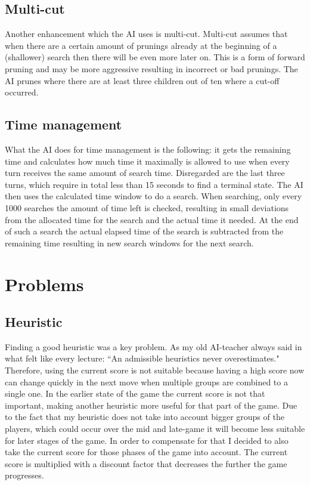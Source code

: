 \documentclass[a4paper]{article}
\begin{document}
\subsection{Multi-cut}
Another enhancement which the AI uses is multi-cut. Multi-cut assumes that when there are a certain amount of prunings already at the beginning of a (shallower) search then there will be even more later on. This is a form of forward pruning and may be more aggressive resulting in incorrect or bad prunings. The AI prunes where there are at least three children out of ten where a cut-off occurred. 

\subsection{Time management}
What the AI does for time management is the following: it gets the remaining time and calculates how much time it maximally is allowed to use when every turn receives the same amount of search time. Disregarded are the last three turns, which require in total less than 15 seconds to find a terminal state. The AI then uses the calculated time window to do a search. When searching, only every 1000 searches the amount of time left is checked, resulting in small deviations from the allocated time for the search and the actual time it needed. At the end of such a search the actual elapsed time of the search is subtracted from the remaining time resulting in new search windows for the next search.

\section{Problems}
\subsection{Heuristic}
Finding a good heuristic was a key problem. As my old AI-teacher always said in what felt like every lecture: ``An admissible heuristics never overestimates." Therefore, using the current score is not suitable because having a high score now can change quickly in the next move when multiple groups are combined to a single one. In the earlier state of the game the current score is not that important, making another heuristic more useful for that part of the game. Due to the fact that my heuristic does not take into account bigger groups of the players, which could occur over the mid and late-game it will become less suitable for later stages of the game. In order to compensate for that I decided to also take the current score for those phases of the game into account. The current score is multiplied with a discount factor that decreases the further the game progresses.
\end{document}

